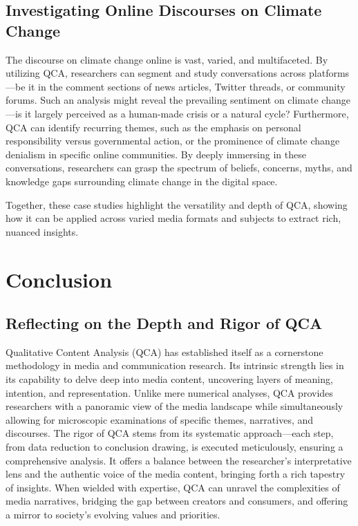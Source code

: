 \documentclass[
  b5paper]{book}
\begin{document}
\hypertarget{investigating-online-discourses-on-climate-change}{%
\subsection*{Investigating Online Discourses on Climate Change}\label{investigating-online-discourses-on-climate-change}}

The discourse on climate change online is vast, varied, and multifaceted. By utilizing QCA, researchers can segment and study conversations across platforms---be it in the comment sections of news articles, Twitter threads, or community forums. Such an analysis might reveal the prevailing sentiment on climate change---is it largely perceived as a human-made crisis or a natural cycle? Furthermore, QCA can identify recurring themes, such as the emphasis on personal responsibility versus governmental action, or the prominence of climate change denialism in specific online communities. By deeply immersing in these conversations, researchers can grasp the spectrum of beliefs, concerns, myths, and knowledge gaps surrounding climate change in the digital space.

Together, these case studies highlight the versatility and depth of QCA, showing how it can be applied across varied media formats and subjects to extract rich, nuanced insights.

\hypertarget{conclusion-2}{%
\section{Conclusion}\label{conclusion-2}}

\hypertarget{reflecting-on-the-depth-and-rigor-of-qca}{%
\subsection*{Reflecting on the Depth and Rigor of QCA}\label{reflecting-on-the-depth-and-rigor-of-qca}}

Qualitative Content Analysis (QCA) has established itself as a cornerstone methodology in media and communication research. Its intrinsic strength lies in its capability to delve deep into media content, uncovering layers of meaning, intention, and representation. Unlike mere numerical analyses, QCA provides researchers with a panoramic view of the media landscape while simultaneously allowing for microscopic examinations of specific themes, narratives, and discourses. The rigor of QCA stems from its systematic approach---each step, from data reduction to conclusion drawing, is executed meticulously, ensuring a comprehensive analysis. It offers a balance between the researcher's interpretative lens and the authentic voice of the media content, bringing forth a rich tapestry of insights. When wielded with expertise, QCA can unravel the complexities of media narratives, bridging the gap between creators and consumers, and offering a mirror to society's evolving values and priorities.
\end{document}
